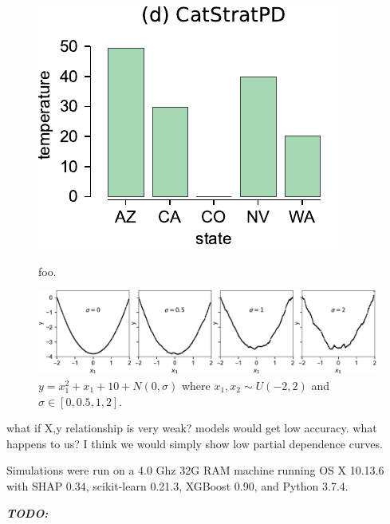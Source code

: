 \documentclass{article}
\newcommand{\cut}[1]{}
\newcommand{\todo}[1]{{\bf\em TODO:} {{\color{red}{#1}}}}
\begin{document}
\begin{figure}[htbp]
\begin{center}
\includegraphics[scale=0.45]{images/state_vs_temp_stratpd.pdf}~~
\caption{\small foo.}
\label{fig:statetemp}
\end{center}
\end{figure}

\begin{figure}[htbp]
\begin{center}
\includegraphics[scale=0.4]{images/noise.pdf}
\caption{\small $y = x_1^2 + x_1 + 10 + N(0,\sigma)$ where $x_1,x_2 \sim U(-2,2)$ and $\sigma \in [0,0.5,1,2]$.}
\label{fig:noise}
\end{center}
\end{figure}


what if X,y relationship is very weak? models would get low accuracy. what happens to us?  I think we would simply show low partial dependence curves.

Simulations were run on a 4.0 Ghz 32G RAM machine running OS X 10.13.6 with SHAP 0.34, scikit-learn                       0.21.3, XGBoost 0.90, and Python 3.7.4.

\todo{unsupervised?}

\cut{
flight shape (5714008, 17), 6 cats
rent shape (49352, 20), no cats
bulldozer shape (362781, 14) records, 5 cats
}
\end{document}
